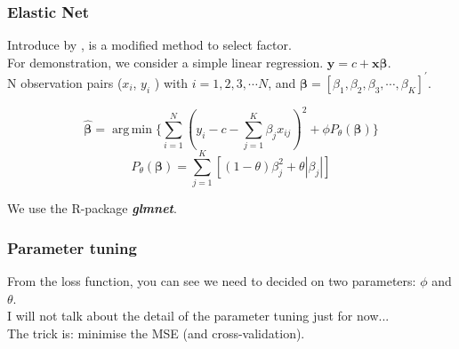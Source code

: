 \documentclass[12pt]{beamer}
\DeclareMathOperator*{\argmin}{arg\,min}
\begin{document}
	
\begin{frame}
\frametitle{Elastic Net}
Introduce by , is a modified method to select factor.\\
For demonstration, we consider a simple linear regression. $\boldsymbol{y} = c +  \boldsymbol{x}{\boldsymbol{\beta}}$. \\ N observation pairs ($x_i$, $y_i$ ) with $i =1,2,3, \cdots N$, and $\boldsymbol{\beta} = [\beta_1, \beta_2, \beta_3, \cdots, \beta_K]^{\prime}$.


\[  \hat{\boldsymbol{\beta}} = \argmin \{ \sum_{i = 1}^N(y_i - c - \sum_{j=1}^{K}\beta_{j}x_{ij})^2 + \phi P_\theta(\boldsymbol{\beta})          \}  \]
\[  P_{\theta}(\boldsymbol{\beta}) = \sum_{j = 1}^{K}[(1- \theta)\beta_j^2 + \theta |\beta_j| ]          \]

	
	
	
	
We use the R-package \textbf{\textit{glmnet}}. \cite{Friedman2010}\\
\end{frame}

\begin{frame}
\frametitle{Parameter tuning}
From the loss function, you can see we need to decided on two parameters: \alert{$\phi$} and \alert{$\theta$}.\\
I will not talk about the detail of the parameter tuning just for now...\\
The trick is: minimise the MSE (and cross-validation).\\
\end{frame}
\end{document}
